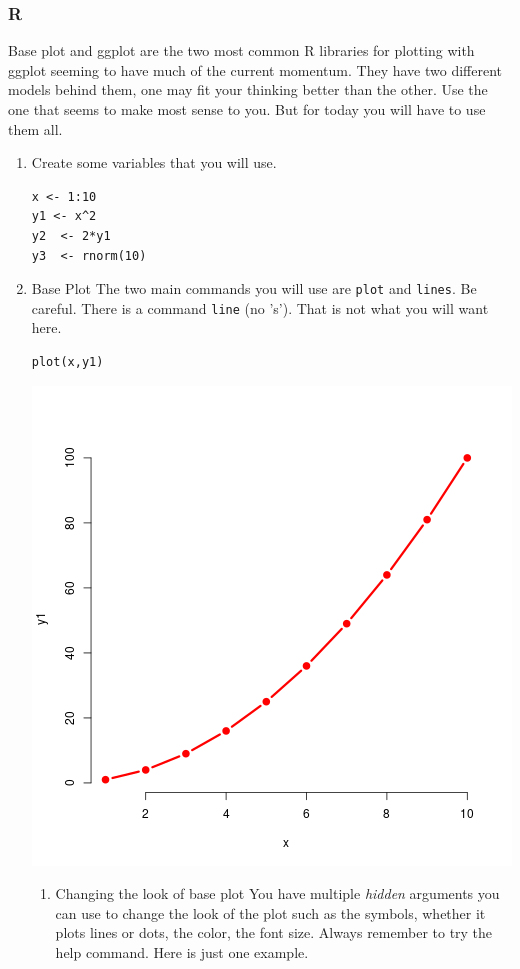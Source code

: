 \documentclass{article}
\begin{document}
\subsubsection{R}
\label{sec:org09d3b68}
Base plot and ggplot are the two most common R libraries for plotting with ggplot seeming to have much of the current momentum. They have two different models behind them, one may fit your thinking better than the other. Use the one that seems to make most sense to you. But for today you will have to use them all.
\begin{enumerate}
\item Create some variables that you will use.
\label{sec:orgddb0e41}
\begin{verbatim}
x <- 1:10
y1 <- x^2
y2  <- 2*y1
y3  <- rnorm(10)
\end{verbatim}
\item Base Plot
\label{sec:org814eab7}
The two main commands you will use are \texttt{plot} and \texttt{lines}. Be careful. There is a command \texttt{line} (no 's'). That is not what you will want here.
\begin{verbatim}
plot(x,y1)
\end{verbatim}

\begin{center}
\includegraphics[width=.9\linewidth]{baseplot1.png}
\end{center}
\begin{enumerate}
\item Changing the look of base plot
\label{sec:org2bb0efb}
You have multiple \emph{hidden} arguments you can use to change the look of the plot such as the symbols, whether it plots lines or dots, the color, the font size. Always remember to try the help command. Here is just one example.


\end{enumerate}
\end{enumerate}
\end{document}
